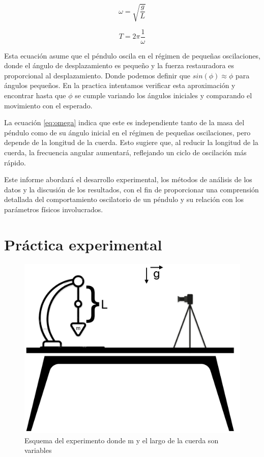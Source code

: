 \documentclass[12pt,a4]{article}
\begin{document}
\begin{equation}
    \omega = \sqrt{\frac{g}{L}}
    \label{eq:omega}
\end{equation}

\begin{equation}
    T = 2 \pi \frac{1}{\omega}
    \label{eq:periodo}
\end{equation}

Esta ecuación asume que el péndulo oscila en el régimen de pequeñas oscilaciones, donde el ángulo de desplazamiento es pequeño y la fuerza restauradora es proporcional al desplazamiento. Donde podemos definir que $sin(\phi) \approx \phi$ para ángulos pequeños. En la practica intentamos verificar esta aproximación y encontrar hasta que $\phi$ se cumple variando los ángulos iniciales y comparando el movimiento con el esperado.

La ecuación \ref{eq:omega} indica que este es independiente tanto de la masa del péndulo como de su ángulo inicial en el régimen de pequeñas oscilaciones, pero depende de la longitud de la cuerda. Esto sugiere que, al reducir la longitud de la cuerda, la frecuencia angular aumentará, reflejando un ciclo de oscilación más rápido.

Este informe abordará el desarrollo experimental, los métodos de análisis de los datos y la discusión de los resultados, con el fin de proporcionar una comprensión detallada del comportamiento oscilatorio de un péndulo y su relación con los parámetros físicos involucrados.

\section{Práctica experimental}

\begin{figure}[H]
    \centering
    \includegraphics[width=0.6\linewidth]{esquema.png}
    \caption{Esquema del experimento donde m y el largo de la cuerda son variables}   
    \label{fig:esquema}
\end{figure}
\end{document}
